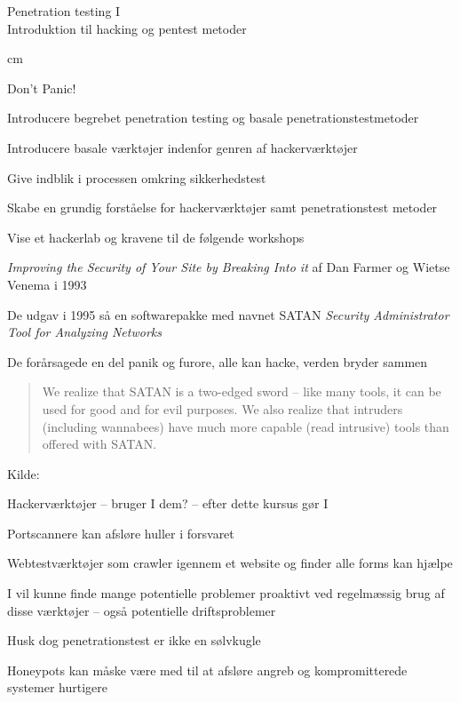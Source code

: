\documentclass[20pt,landscape,a4paper,footrule]{foils}
\begin{document}

\mytitlepage
{Penetration testing I\\Introduktion til hacking og pentest metoder}

\LogoOn



 cm

\centerline{\color{titlecolor}\LARGE Don't Panic!}


\begin{list1}
\item Introducere begrebet penetration testing og basale penetrationstestmetoder
\item Introducere basale værktøjer indenfor genren af hackerværktøjer
\item Give indblik i processen omkring sikkerhedstest
\item Skabe en grundig forståelse for hackerværktøjer
  samt penetrationstest metoder
\item Vise et hackerlab og kravene til de følgende workshops
\end{list1}



\begin{list1}
\item \emph{Improving the Security of Your Site by Breaking Into it} af
Dan Farmer og Wietse Venema i 1993
\item De udgav i 1995 så en softwarepakke med navnet SATAN
\emph{Security Administrator Tool for Analyzing Networks}
\item De forårsagede en del panik og furore, alle kan hacke, verden bryder sammen

\vskip 1cm
\begin{quote}
We realize that SATAN is a two-edged sword -- like
many tools, it can be used for good and for evil
purposes. We also realize that intruders (including
wannabees) have much more capable (read intrusive)
tools than offered with SATAN.
\end{quote}
\end{list1}

\vskip 1cm
Kilde:



\begin{list1}
\item Hackerværktøjer -- bruger I dem? -- efter dette kursus gør I
\item Portscannere kan afsløre huller i forsvaret
\item Webtestværktøjer som crawler igennem et website og finder alle
  forms kan hjælpe
\item I vil kunne finde mange potentielle problemer proaktivt ved
  regelmæssig brug af disse værktøjer -- også potentielle driftsproblemer
\item Husk dog penetrationstest er ikke en sølvkugle
\item Honeypots kan måske være med til at afsløre angreb og
  kompromitterede systemer hurtigere
\end{list1}
\end{document}
